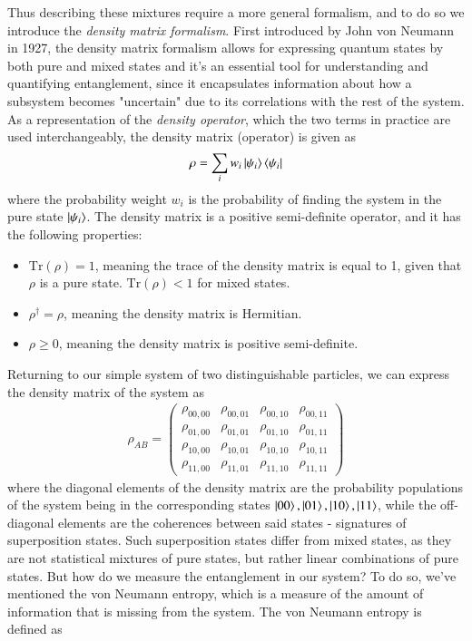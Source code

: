 \documentclass{subfiles}
\begin{document}
Thus describing these mixtures require a more general formalism, and to do so we introduce the \emph{density matrix formalism}. First introduced by John von Neumann in 1927\cite{neumann1927}, the density matrix formalism allows for expressing quantum states by both pure and mixed states and it's an essential tool for understanding and quantifying entanglement, since it encapsulates information about how a subsystem becomes "uncertain" due to its correlations with the rest of the system. As a representation of the \emph{density operator}, which the two terms in practice are used interchangeably, the density matrix (operator) is given as
\begin{equation}
    \rho = \sum_i w_i\ket{\psi_i}\bra{\psi_i}\label{eq:density_matrix}
\end{equation}
where the probability weight $w_i$ is the probability of finding the system in the pure state $\ket{\psi_i}$. The density matrix is a positive semi-definite operator, and it has the following properties:
\begin{itemize}
    \item $\text{Tr}(\rho) = 1$, meaning the trace of the density matrix is equal to 1, given that $\rho$ is a pure state. $\text{Tr}(\rho) < 1$ for mixed states.
    \item $\rho^\dagger = \rho$, meaning the density matrix is Hermitian.
    \item $\rho \geq 0$, meaning the density matrix is positive semi-definite.
\end{itemize}
Returning to our simple system of two distinguishable particles, we can express the density matrix of the system as
\begin{align*}
    \rho_{AB} = \begin{pmatrix}
        \rho_{00, 00} & \rho_{00, 01} & \rho_{00, 10} & \rho_{00, 11} \\
        \rho_{01, 00} & \rho_{01, 01} & \rho_{01, 10} & \rho_{01, 11} \\
        \rho_{10, 00} & \rho_{10, 01} & \rho_{10, 10} & \rho_{10, 11} \\
        \rho_{11, 00} & \rho_{11, 01} & \rho_{11, 10} & \rho_{11, 11}
    \end{pmatrix}
\end{align*}
where the diagonal elements of the density matrix are the probability populations of the system being in the corresponding states $\ket{00}, \ket{01}, \ket{10}, \ket{11}$, while the off-diagonal elements are the coherences between said states - signatures of superposition states. Such superposition states differ from mixed states, as they are not statistical mixtures of pure states, but rather linear combinations of pure states. But how do we measure the entanglement in our system? To do so, we've mentioned the von Neumann entropy, which is a measure of the amount of information that is missing from the system. The von Neumann entropy is defined as
\end{document}
